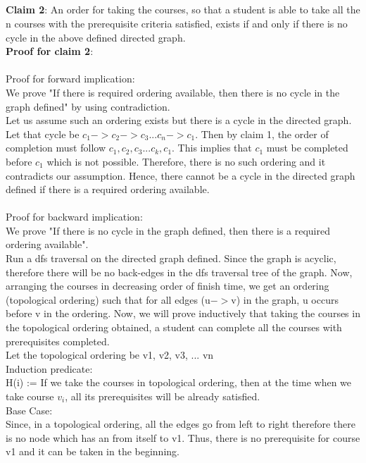\documentclass{article}
\begin{document}
\subsection{}
\textbf{Claim 2}: An order for taking the courses, so that a student is able to take all the n courses with the prerequisite criteria satisfied, exists if and only if there is no cycle in the above defined directed graph.\\
\textbf{Proof for claim 2}:\\
\\Proof for forward implication:
\\We prove "If there is required ordering available, then there is no cycle in the graph defined" by using contradiction.
\\Let us assume such an ordering exists but there is a cycle in the directed graph. Let that cycle be $c_1->c_2->c_3...c_n->c_1$. Then by claim 1, the order of completion must follow $c_1, c_2, c_3...c_k, c_1$. This implies that $c_1$ must be completed before $c_1$ which is not possible. Therefore, there is no such ordering and it contradicts our assumption. Hence, there cannot be a cycle in the directed graph defined if there is a required ordering available.
\\
\\Proof for backward implication:
\\We prove "If there is no cycle in the graph defined, then there is a required ordering available".
\\Run a dfs traversal on the directed graph defined. Since the graph is acyclic, therefore there will be no back-edges in the dfs traversal tree of the graph. Now, arranging the courses in decreasing order of finish time, we get an ordering (topological ordering) such that for all edges (u$->$v) in the graph, u occurs before v in the ordering. Now, we will prove inductively that taking the courses in the topological ordering obtained, a student can complete all the courses with prerequisites completed.
\\
Let the topological ordering be v1, v2, v3, ... vn\\
Induction predicate:\\
H(i) := If we take the courses in topological ordering, then at the time when we take course $v_i$, all its prerequisites will be already satisfied.\\
Base Case:\\
Since, in a topological ordering, all the edges go from left to right therefore there is no node which has an from itself to v1. Thus, there is no prerequisite for course v1 and it can be taken in the beginning.\\
\end{document}
